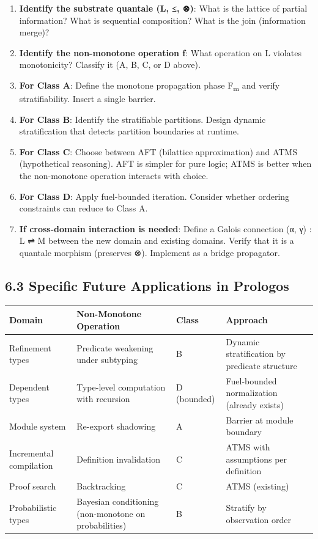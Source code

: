 \documentclass[11pt]{article}
\begin{document}
\begin{enumerate}
\item \textbf{Identify the substrate quantale (L, ≤, ⊗)}: What is the lattice of partial
information? What is sequential composition? What is the join (information merge)?

\item \textbf{Identify the non-monotone operation f}: What operation on L violates
monotonicity? Classify it (A, B, C, or D above).

\item \textbf{For Class A}: Define the monotone propagation phase F\textsubscript{m} and verify
stratifiability. Insert a single barrier.

\item \textbf{For Class B}: Identify the stratifiable partitions. Design dynamic
stratification that detects partition boundaries at runtime.

\item \textbf{For Class C}: Choose between AFT (bilattice approximation) and ATMS
(hypothetical reasoning). AFT is simpler for pure logic; ATMS is better
when the non-monotone operation interacts with choice.

\item \textbf{For Class D}: Apply fuel-bounded iteration. Consider whether ordering
constraints can reduce to Class A.

\item \textbf{If cross-domain interaction is needed}: Define a Galois connection
(α, γ) : L ⇌ M between the new domain and existing domains. Verify that
it is a quantale morphism (preserves ⊗). Implement as a bridge propagator.
\end{enumerate}
\subsection{6.3 Specific Future Applications in Prologos}
\label{sec:org475e38f}

\begin{center}
\begin{tabular}{llll}
Domain & Non-Monotone Operation & Class & Approach\\
\hline
Refinement types & Predicate weakening under subtyping & B & Dynamic stratification by predicate structure\\
Dependent types & Type-level computation with recursion & D (bounded) & Fuel-bounded normalization (already exists)\\
Module system & Re-export shadowing & A & Barrier at module boundary\\
Incremental compilation & Definition invalidation & C & ATMS with assumptions per definition\\
Proof search & Backtracking & C & ATMS (existing)\\
Probabilistic types & Bayesian conditioning (non-monotone on probabilities) & B & Stratify by observation order\\
\end{tabular}
\end{center}
\end{document}
